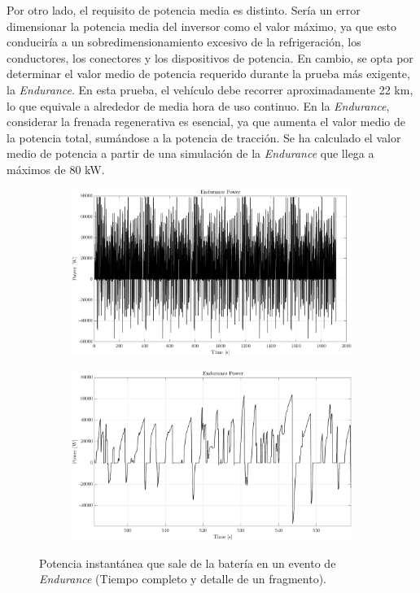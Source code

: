 Por otro lado, el requisito de potencia media es distinto. Sería un error dimensionar la potencia media del inversor como el valor máximo, ya que esto conduciría a un sobredimensionamiento excesivo de la refrigeración, los conductores, los conectores y los dispositivos de potencia. En cambio, se opta por determinar el valor medio de potencia requerido durante la prueba más exigente, la \textit{Endurance}. En esta prueba, el vehículo debe recorrer aproximadamente 22 km, lo que equivale a alrededor de media hora de uso continuo. En la \textit{Endurance}, considerar la frenada regenerativa es esencial, ya que aumenta el valor medio de la potencia total, sumándose a la potencia de tracción. Se ha calculado el valor medio de potencia a partir de una simulación de la \textit{Endurance} que llega a máximos de 80 kW.

\begin{figure}[H]
	\centering
	\begin{subfigure}[b]{0.45\textwidth}
		\centering
		\includegraphics[width=\textwidth]{fig/powerRMS}
	\end{subfigure}
	\hfill
	\begin{subfigure}[b]{0.45\textwidth}
		\centering
		\includegraphics[width=\textwidth]{fig/powerRMS-zoom}
	\end{subfigure}
	\caption{Potencia instantánea que sale de la batería en un evento de \textit{Endurance} (Tiempo completo y detalle de un fragmento).}
\end{figure}

